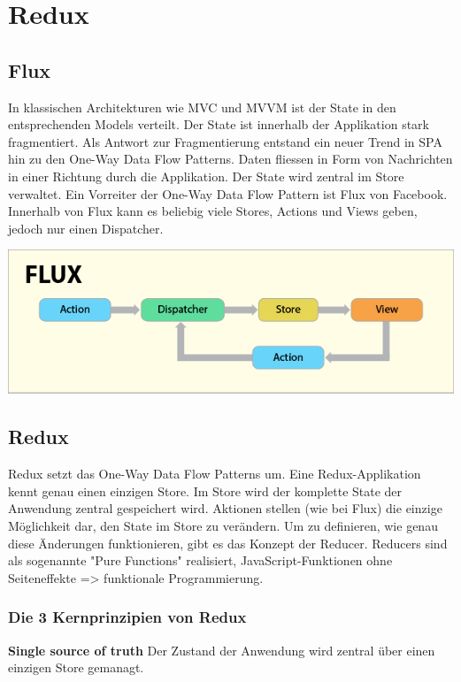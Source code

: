 \section{Redux}
\subsection{Flux}

In klassischen Architekturen wie MVC und MVVM ist der State in den entsprechenden Models verteilt. Der State ist innerhalb der Applikation stark fragmentiert. Als Antwort zur Fragmentierung entstand ein neuer Trend in SPA hin zu den One-Way Data Flow Patterns. Daten fliessen in Form von Nachrichten in einer Richtung durch die Applikation.  Der State wird zentral im Store verwaltet. Ein Vorreiter der One-Way Data Flow Pattern ist Flux von Facebook. Innerhalb von Flux kann es beliebig viele Stores, Actions und Views geben, jedoch nur einen Dispatcher.

\includegraphics[width=\columnwidth]{images/flux}

\subsection{Redux}
Redux setzt das One-Way Data Flow Patterns um. Eine Redux-Applikation kennt genau einen einzigen Store. Im Store wird der komplette State der Anwendung zentral gespeichert wird. Aktionen stellen (wie bei Flux) die einzige Möglichkeit dar, den State im Store zu verändern. Um zu definieren, wie genau diese Änderungen funktionieren, gibt es das Konzept der Reducer. Reducers sind als sogenannte "Pure Functions" realisiert, JavaScript-Funktionen ohne Seiteneffekte => funktionale Programmierung.

\subsubsection{Die 3 Kernprinzipien von Redux}
\textbf{Single source of truth}
Der Zustand der Anwendung wird zentral über einen einzigen Store gemanagt.

